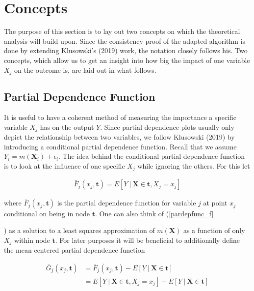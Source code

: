 \par{

\section{Concepts}
The purpose of this section is to lay out two concepts on which the theoretical analysis will build upon. Since the consistency proof of the adapted algorithm is done by extending Klusowski's (2019) work, the notation closely follows his. Two concepts, which allow us to get an insight into how big the impact of one variable $X_j$ on the outcome is, are laid out in what follows.


\subsection{Partial Dependence Function}

It is useful to have a coherent method of measuring the importance a specific variable $X_j$ has on the output $Y$. 
Since partial dependence plots usually only depict the relationship between two variables, we follow Klusowski (2019) by introducing a conditional partial dependence function. 
Recall that we assume $Y_i = m(\mathbf{X}_i) + \epsilon_i$. 
The idea behind the conditional partial dependence function is to look at the influence of one specific $X_j$ while ignoring the others. 
For this let 

\begin{align}
    \bar{F}_j(x_j, \mathbf{t}) = E [Y \ | \ \mathbf{X} \in \mathbf{t}, X_j = x_j] \label{pardepfunc_f}
\end{align}

where $\bar{F}_j(x_j, \mathbf{t})$ is the partial dependence function for variable $j$ at point $x_j$ conditional on being in node $\mathbf{t}$. 
One can also think of (\ref{pardepfunc_f}}) as a solution to a least squares approximation of $m(\mathbf{X})$ as a function of only $X_j$ within node $\mathbf{t}$.
For later purposes it will be beneficial to additionally define the mean centered partial dependence function 

\begin{align}
    \bar{G}_j(x_j, \mathbf{t}) &= \bar{F}_j(x_j, \mathbf{t}) - E [Y \ | \ \mathbf{X} \in \mathbf{t}] \nonumber \\
    &= E [Y \ | \ \mathbf{X} \in \mathbf{t}, X_j = x_j] - E [Y \ | \ \mathbf{X} \in \mathbf{t}] \label{pardepfunc_g}
\end{align}

